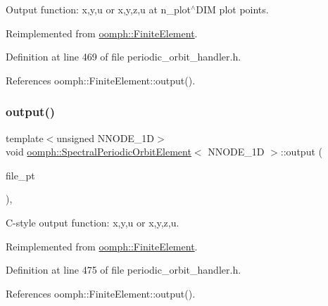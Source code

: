 Output function\+: x,y,u or x,y,z,u at n\+\_\+plot$^\wedge$\+D\+IM plot points. 



Reimplemented from \hyperlink{classoomph_1_1FiniteElement_afa9d9b2670f999b43e6679c9dd28c457}{oomph\+::\+Finite\+Element}.



Definition at line 469 of file periodic\+\_\+orbit\+\_\+handler.\+h.



References oomph\+::\+Finite\+Element\+::output().

\mbox{\label{classoomph_1_1SpectralPeriodicOrbitElement_a2a16805778b8497d7b394f3cbd010fc0}} 
\subsubsection{\texorpdfstring{output()}{output()}\hspace{0.1cm}{\footnotesize\ttfamily [3/4]}}
{\footnotesize\ttfamily template$<$unsigned N\+N\+O\+D\+E\+\_\+1D$>$ \\
void \hyperlink{classoomph_1_1SpectralPeriodicOrbitElement}{oomph\+::\+Spectral\+Periodic\+Orbit\+Element}$<$ N\+N\+O\+D\+E\+\_\+1D $>$\+::output (\begin{DoxyParamCaption}\item[{F\+I\+LE $\ast$}]{file\+\_\+pt }\end{DoxyParamCaption})\hspace{0.3cm}{\ttfamily [inline]}, {\ttfamily [virtual]}}



C-\/style output function\+: x,y,u or x,y,z,u. 



Reimplemented from \hyperlink{classoomph_1_1FiniteElement_a72cddd09f8ddbee1a20a1ff404c6943e}{oomph\+::\+Finite\+Element}.



Definition at line 475 of file periodic\+\_\+orbit\+\_\+handler.\+h.



References oomph\+::\+Finite\+Element\+::output().

\mbox{\label{classoomph_1_1SpectralPeriodicOrbitElement_ae8bcd7bd13389fe289242750880cd9bf}} 
